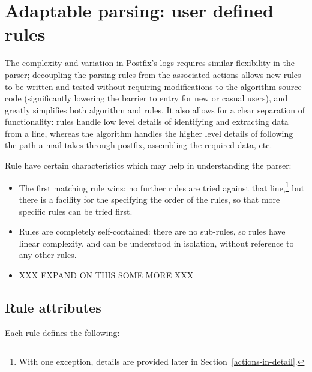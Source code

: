 \documentclass[a4paper,12pt,draft]{article}
\begin{document}
\section{Adaptable parsing: user defined rules}

The complexity and variation in Postfix's logs requires similar flexibility
in the parser; decoupling the parsing rules from the associated actions
allows new rules to be written and tested without requiring modifications
to the algorithm source code (significantly lowering the barrier to entry
for new or casual users), and greatly simplifies both algorithm and rules.
It also allows for a clear separation of functionality: rules handle low
level details of identifying and extracting data from a line, whereas the
algorithm handles the higher level details of following the path a mail
takes through postfix, assembling the required data, etc.

Rule have certain characteristics which may help in understanding the
parser:

\begin{itemize}

    \item The first matching rule wins: no further rules are tried against
        that line,\footnote{With one exception, details are provided later
        in Section~\ref{actions-in-detail}.} but there is a facility for
        the specifying the order of the rules, so that more specific rules
        can be tried first.

    \item Rules are completely self-contained: there are no sub-rules, so
        rules have linear complexity, and can be understood in isolation,
        without reference to any other rules.

    \item XXX EXPAND ON THIS SOME MORE XXX

\end{itemize}

\subsection{Rule attributes}

Each rule defines the following:
\end{document}
